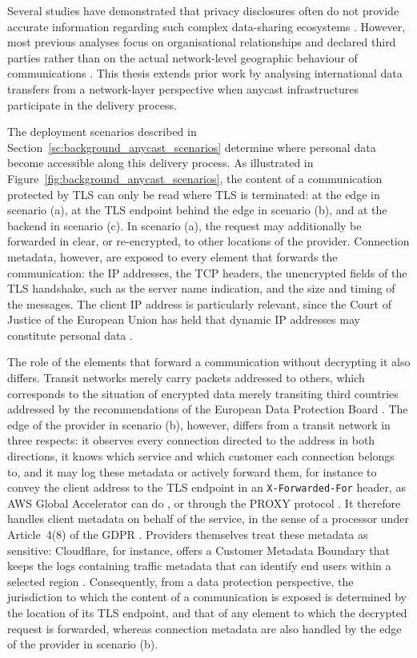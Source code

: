 Several studies have demonstrated that privacy disclosures often do not provide accurate information regarding such complex data-sharing ecosystems \cite{DelAlamo2021PrivacyStudy, DelAlamo2022APolicies}. However, most previous analyses focus on organisational relationships and declared third parties rather than on the actual network-level geographic behaviour of communications \cite{Guaman2021GDPRApps}. This thesis extends prior work by analysing international data transfers from a network-layer perspective when anycast infrastructures participate in the delivery process.

The deployment scenarios described in Section~\ref{sc:background_anycast_scenarios} determine where personal data become accessible along this delivery process. As illustrated in Figure~\ref{fig:background_anycast_scenarios}, the content of a communication protected by TLS can only be read where TLS is terminated: at the edge in scenario (a), at the TLS endpoint behind the edge in scenario (b), and at the backend in scenario (c). In scenario (a), the request may additionally be forwarded in clear, or re-encrypted, to other locations of the provider. Connection metadata, however, are exposed to every element that forwards the communication: the IP addresses, the TCP headers, the unencrypted fields of the TLS handshake, such as the server name indication, and the size and timing of the messages. The client IP address is particularly relevant, since the Court of Justice of the European Union has held that dynamic IP addresses may constitute personal data \cite{InfoCuriaEuropeenne}.

The role of the elements that forward a communication without decrypting it also differs. Transit networks merely carry packets addressed to others, which corresponds to the situation of encrypted data merely transiting third countries addressed by the recommendations of the European Data Protection Board \cite{RecommendationsBoard}. The edge of the provider in scenario (b), however, differs from a transit network in three respects: it observes every connection directed to the address in both directions, it knows which service and which customer each connection belongs to, and it may log these metadata or actively forward them, for instance to convey the client address to the TLS endpoint in an \texttt{X-Forwarded-For} header, as AWS Global Accelerator can do \cite{HowAcceleratorb}, or through the PROXY protocol \cite{The2}. It therefore handles client metadata on behalf of the service, in the sense of a processor under Article~4(8) of the GDPR \cite{REGULATIONSRelevance}. Providers themselves treat these metadata as sensitive: Cloudflare, for instance, offers a Customer Metadata Boundary that keeps the logs containing traffic metadata that can identify end users within a selected region \cite{CustomerDocs}. Consequently, from a data protection perspective, the jurisdiction to which the content of a communication is exposed is determined by the location of its TLS endpoint, and that of any element to which the decrypted request is forwarded, whereas connection metadata are also handled by the edge of the provider in scenario (b).

